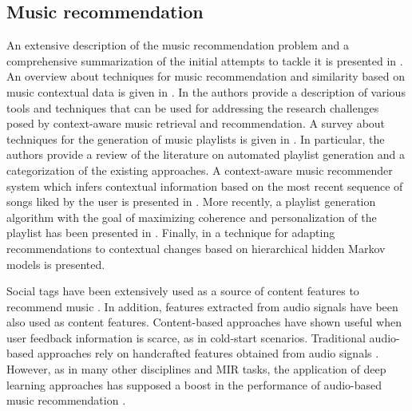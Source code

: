 \subsection{Music recommendation}
\label{sec:SOA:mir:music-recommendation}

An extensive description of the music recommendation problem and a comprehensive summarization of the initial attempts to tackle it is presented in \citep{Celma2010}. An overview about techniques for music recommendation and similarity based on music contextual data is given in \citep{Knees2013}. 
In \citep{KaminskasR12} the authors provide a description of various tools and techniques that can be used for addressing the research
challenges posed by context-aware music retrieval and recommendation. 
A survey about techniques for the generation of music playlists is given in \citep{Bonnin2014}. In particular, the authors provide a review of the literature on automated playlist generation and a categorization of the existing approaches. 
A context-aware music recommender system which infers contextual information based on the most recent sequence of songs liked by the user is presented in \citep{HaririMB12}.
More recently, a playlist generation algorithm with the goal of maximizing coherence and personalization of the playlist has been presented in \citep{Jannach2015}. Finally, in \citep{AghdamHMB15} a technique for adapting recommendations to contextual changes based on hierarchical hidden Markov models is presented.



Social tags have been extensively used as a source of content features to recommend music \citep{Knees2013}. In addition, features extracted from audio signals have been also used as content features. Content-based approaches have shown useful when user feedback information is scarce, as in cold-start scenarios. Traditional audio-based approaches rely on handcrafted features obtained from audio signals \citep{Bogdanov2013}. However, as in many other disciplines and MIR tasks, the application of deep learning approaches has supposed a boost in the performance of audio-based music recommendation \citep{Oord2013}. 

